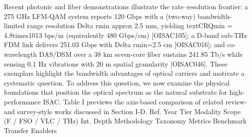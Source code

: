 {}Recent photonic and fiber demonstrations illustrate the rate–resolution frontier: a 275 GHz LFM-QAM system reports 120 Gbps with a (two-way) bandwidth-limited range resolution \markdownRendererDollarSign{}\markdownRendererBackslash{}Delta r\markdownRendererUnderscore{}\markdownRendererLeftBrace{}\markdownRendererBackslash{}min\markdownRendererRightBrace{} \markdownRendererBackslash{}approx 2.5\markdownRendererDollarSign{} mm, yielding \markdownRendererDollarSign{}\markdownRendererBackslash{}text\markdownRendererLeftBrace{}CRQ\markdownRendererRightBrace{}\markdownRendererLeftBrace{}\markdownRendererBackslash{}min\markdownRendererRightBrace{} = 4.8\markdownRendererBackslash{}times10\markdownRendererCircumflex{}\markdownRendererLeftBrace{}13\markdownRendererRightBrace{}\markdownRendererDollarSign{} bps/m (equivalently 480 Gbps/cm) [O\markdownRendererUnderscore{}ISAC\markdownRendererUnderscore{}105]; a D-band sub-THz FDM link delivers 251.03 Gbps with \markdownRendererDollarSign{}\markdownRendererBackslash{}Delta r\markdownRendererUnderscore{}\markdownRendererLeftBrace{}\markdownRendererBackslash{}min\markdownRendererRightBrace{}=2.5\markdownRendererDollarSign{} cm [O\markdownRendererUnderscore{}ISAC\markdownRendererUnderscore{}016]; and co-wavelength DAS/DSM over a 38 km seven-core fiber sustains 241.85 Tb/s while sensing 0.1 Hz vibrations with 20 m spatial granularity [O\markdownRendererUnderscore{}ISAC\markdownRendererUnderscore{}046]. These exemplars highlight the bandwidth advantages of optical carriers and motivate a systematic question.\markdownRendererParagraphSeparator
{} To address this question, we now examine the physical foundations that position the optical spectrum as the natural substrate for high-performance ISAC.\markdownRendererParagraphSeparator
{}Table I previews the axis-based comparison of related review- and survey-style works discussed in Section I-D.\markdownRendererInterblockSeparator
{}\markdownRendererSectionBegin
{}\markdownRendererInterblockSeparator
{}\markdownRendererPipe{} Ref. \markdownRendererPipe{} Year \markdownRendererPipe{} Tier \markdownRendererPipe{} Modality Scope (F / FSO / VLC / THz) \markdownRendererPipe{} Int. Depth \markdownRendererPipe{} Methodology \markdownRendererPipe{} Taxonomy \markdownRendererPipe{} Metrics \markdownRendererPipe{} Benchmark \markdownRendererPipe{} Transfer \markdownRendererPipe{} Enablers \markdownRendererPipe{}\markdownRendererSoftLineBreak
